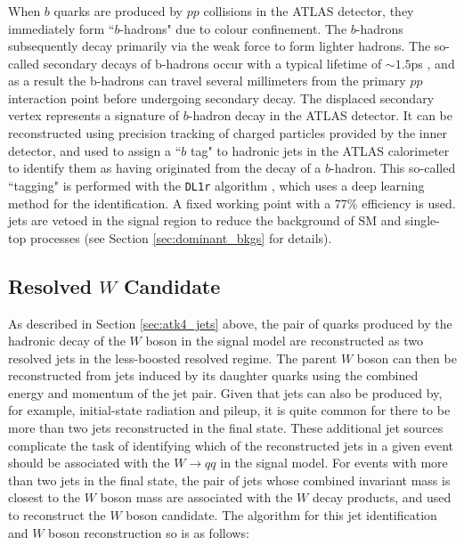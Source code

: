 \subsubsection{\btag}
\label{sec:btag}

When \(b\) quarks are produced by \(pp\) collisions in the ATLAS detector, they immediately form ``\(b\)-hadrons" due to colour confinement. The \(b\)-hadrons subsequently decay primarily via the weak force \cite{PDG_2018} to form lighter hadrons. The so-called secondary decays of b-hadrons occur with a typical lifetime of \(\sim 1.5\)ps \cite{PDG_2018}, and as a result the b-hadrons can travel several millimeters from the primary \(pp\) interaction point \cite{ATLAS-CONF-2018-006} before undergoing secondary decay. The displaced secondary vertex represents a signature of \(b\)-hadron decay in the ATLAS detector. It can be reconstructed using precision tracking of charged particles provided by the inner detector, and used to assign a ``\(b\) tag" to hadronic jets in the ATLAS calorimeter to identify them as having originated from the decay of a \(b\)-hadron. This so-called ``\bjet tagging" is performed with the \verb|DL1r| algorithm \cite{ATLAS-CONF-2018-006}, which uses a deep learning method for the identification. A fixed working point with a 77\% efficiency is used. \btagged jets are vetoed in the signal region to reduce the background of SM \ttbar and single-top processes (see Section \ref{sec:dominant_bkgs} for details).

\subsection{Resolved \(W\) Candidate}
\label{sec:resolved_w_cand}

As described in Section \ref{sec:atk4_jets} above, the pair of quarks produced by the hadronic decay of the \(W\) boson in the signal model are reconstructed as two resolved \smallR jets in the less-boosted resolved regime. The parent \(W\) boson can then be reconstructed from \smallR jets induced by its daughter quarks using the combined energy and momentum of the \smallR jet pair. Given that \smallR jets can also be produced by, for example, initial-state radiation and pileup, it is quite common for there to be more than two \smallR jets reconstructed in the final state. These additional jet sources complicate the task of identifying which of the reconstructed \smallR jets in a given event should be associated with the \(W\rightarrow qq\) in the signal model. For events with more than two \smallR jets in the final state, the pair of \smallR jets whose combined invariant mass is closest to the \(W\) boson mass are associated with the \(W\) decay products, and used to reconstruct the \(W\) boson candidate. The algorithm for this jet identification and \(W\) boson reconstruction so is as follows:

